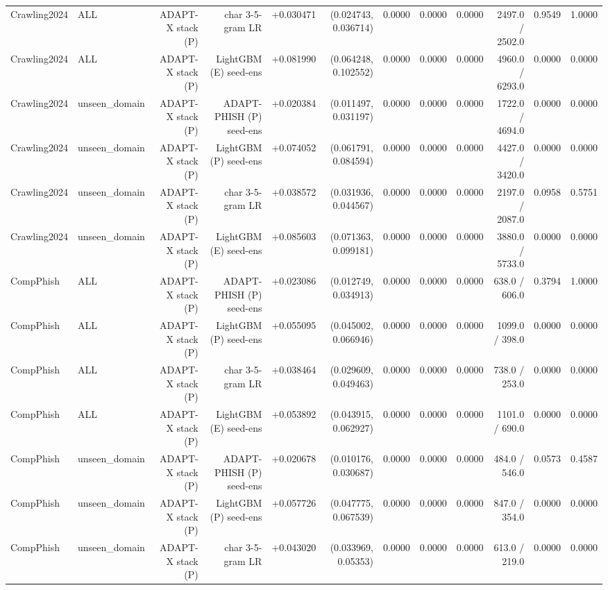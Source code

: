 \begin{table}[t]
\begin{tabular}{llrrrrrrrrrr}
Crawling2024 & ALL & ADAPT-X stack (P) & char 3-5-gram LR & +0.030471 & (0.024743, 0.036714) & 0.0000 & 0.0000 & 0.0000 & 2497.0 / 2502.0 & 0.9549 & 1.0000 \\
Crawling2024 & ALL & ADAPT-X stack (P) & LightGBM (E) seed-ens & +0.081990 & (0.064248, 0.102552) & 0.0000 & 0.0000 & 0.0000 & 4960.0 / 6293.0 & 0.0000 & 0.0000 \\
Crawling2024 & unseen\_domain & ADAPT-X stack (P) & ADAPT-PHISH (P) seed-ens & +0.020384 & (0.011497, 0.031197) & 0.0000 & 0.0000 & 0.0000 & 1722.0 / 4694.0 & 0.0000 & 0.0000 \\
Crawling2024 & unseen\_domain & ADAPT-X stack (P) & LightGBM (P) seed-ens & +0.074052 & (0.061791, 0.084594) & 0.0000 & 0.0000 & 0.0000 & 4427.0 / 3420.0 & 0.0000 & 0.0000 \\
Crawling2024 & unseen\_domain & ADAPT-X stack (P) & char 3-5-gram LR & +0.038572 & (0.031936, 0.044567) & 0.0000 & 0.0000 & 0.0000 & 2197.0 / 2087.0 & 0.0958 & 0.5751 \\
Crawling2024 & unseen\_domain & ADAPT-X stack (P) & LightGBM (E) seed-ens & +0.085603 & (0.071363, 0.099181) & 0.0000 & 0.0000 & 0.0000 & 3880.0 / 5733.0 & 0.0000 & 0.0000 \\
CompPhish & ALL & ADAPT-X stack (P) & ADAPT-PHISH (P) seed-ens & +0.023086 & (0.012749, 0.034913) & 0.0000 & 0.0000 & 0.0000 & 638.0 / 606.0 & 0.3794 & 1.0000 \\
CompPhish & ALL & ADAPT-X stack (P) & LightGBM (P) seed-ens & +0.055095 & (0.045002, 0.066946) & 0.0000 & 0.0000 & 0.0000 & 1099.0 / 398.0 & 0.0000 & 0.0000 \\
CompPhish & ALL & ADAPT-X stack (P) & char 3-5-gram LR & +0.038464 & (0.029609, 0.049463) & 0.0000 & 0.0000 & 0.0000 & 738.0 / 253.0 & 0.0000 & 0.0000 \\
CompPhish & ALL & ADAPT-X stack (P) & LightGBM (E) seed-ens & +0.053892 & (0.043915, 0.062927) & 0.0000 & 0.0000 & 0.0000 & 1101.0 / 690.0 & 0.0000 & 0.0000 \\
CompPhish & unseen\_domain & ADAPT-X stack (P) & ADAPT-PHISH (P) seed-ens & +0.020678 & (0.010176, 0.030687) & 0.0000 & 0.0000 & 0.0000 & 484.0 / 546.0 & 0.0573 & 0.4587 \\
CompPhish & unseen\_domain & ADAPT-X stack (P) & LightGBM (P) seed-ens & +0.057726 & (0.047775, 0.067539) & 0.0000 & 0.0000 & 0.0000 & 847.0 / 354.0 & 0.0000 & 0.0000 \\
CompPhish & unseen\_domain & ADAPT-X stack (P) & char 3-5-gram LR & +0.043020 & (0.033969, 0.05353) & 0.0000 & 0.0000 & 0.0000 & 613.0 / 219.0 & 0.0000 & 0.0000 \\

\end{tabular}
\end{table}
